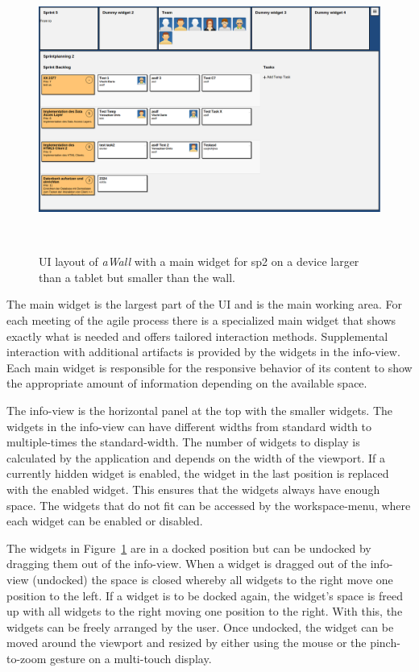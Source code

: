 \documentclass{sigchi}
\begin{document}
\begin{figure}
	\centering
	\includegraphics[width=\columnwidth]{figures/awall-layout}
	\caption{UI layout of \textit{aWall} with a main widget for \gls{sp2} on a device larger than a tablet but smaller than the wall.}~\label{fig:awall-layout}
\end{figure}

The main widget is the largest part of the UI and is the main working area.
For each meeting of the agile process there is a specialized main widget that shows exactly what is needed and offers tailored interaction methods.
Supplemental interaction with additional artifacts is provided by the widgets in the info-view.
Each main widget is responsible for the responsive behavior of its content to show the appropriate amount of information depending on the available space.


The info-view is the horizontal panel at the top with the smaller widgets.
The widgets in the info-view can have different widths from standard width to multiple-times the standard-width.
The number of widgets to display is calculated by the application and depends on the width of the viewport.
If a currently hidden widget is enabled, the widget in the last position is replaced with the enabled widget.
This ensures that the widgets always have enough space.
The widgets that do not fit can be accessed by the workspace-menu, where each widget can be enabled or disabled. 


The widgets in Figure~\ref{fig:awall-layout} are in a docked position but can be undocked by dragging them out of the info-view.
When a widget is dragged out of the info-view (undocked) the space is closed whereby all widgets to the right move one position to the left.
If a widget is to be docked again, the widget's space is freed up with all widgets to the right moving one position to the right.
With this, the widgets can be freely arranged by the user.
Once undocked, the widget can be moved around the viewport and resized by either using the mouse or the pinch-to-zoom gesture on a multi-touch display. 
\end{document}
